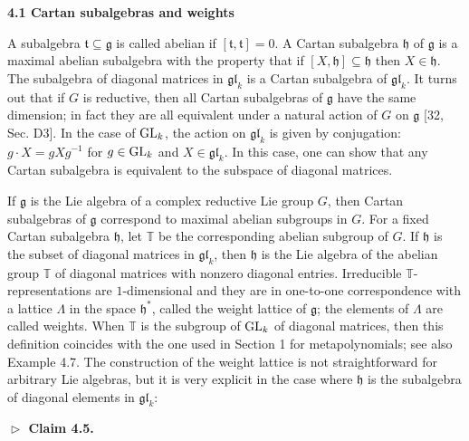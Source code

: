 \par\medskip\noindent\textbf{4.1 Cartan subalgebras and weights}\par




A subalgebra $\mathfrak{t}\subseteq\mathfrak{g}$ is called abelian if $[\mathfrak{t},\mathfrak{t}]=0$. A Cartan subalgebra $\mathfrak{h}$ of $\mathfrak{g}$ is a maximal abelian subalgebra with the property that if $[X,\mathfrak{h}]\subseteq\mathfrak{h}$ then $X\in\mathfrak{h}$. The subalgebra of diagonal matrices in $\mathfrak{gl}_{k}$ is a Cartan subalgebra of $\mathfrak{gl}_{k}$. It turns out that if $G$ is reductive, then all Cartan subalgebras of $\mathfrak{g}$ have the same dimension; in fact they are all equivalent under a natural action of $G$ on $\mathfrak{g}$ [32, Sec. D3]. In the case of $\textnormal{GL}_{k}$, the action on $\mathfrak{gl}_{k}$ is given by conjugation: $g\cdot X=gXg^{-1}$ for $g\in\textnormal{GL}_{k}$ and $X\in\mathfrak{gl}_{k}$. In this case, one can show that any Cartan subalgebra is equivalent to the subspace of diagonal matrices.





If $\mathfrak{g}$ is the Lie algebra of a complex reductive Lie group $G$, then Cartan subalgebras of $\mathfrak{g}$ correspond to maximal abelian subgroups in $G$. For a fixed Cartan subalgebra $\mathfrak{h}$, let $\mathbb{T}$ be the corresponding abelian subgroup of $G$. If $\mathfrak{h}$ is the subset of diagonal matrices in $\mathfrak{gl}_{k}$, then $\mathfrak{h}$ is the Lie algebra of the abelian group $\mathbb{T}$ of diagonal matrices with nonzero diagonal entries.
Irreducible $\mathbb{T}$-representations are $1$-dimensional and they are in one-to-one correspondence with a lattice $\Lambda$ in the space $\mathfrak{h}^{*}$, called the weight lattice of $\mathfrak{g}$; the elements of $\Lambda$ are called weights. When $\mathbb{T}$ is the subgroup of $\textnormal{GL}_{k}$ of diagonal matrices, then this definition coincides with the one used in Section 1 for metapolynomials; see also Example 4.7. The construction of the weight lattice is not straightforward for arbitrary Lie algebras, but it is very explicit in the case where $\mathfrak{h}$ is the subalgebra of diagonal elements in $\mathfrak{gl}_{k}$:





\par\medskip\noindent\textbf{$\vartriangleright$ Claim 4.5.}\par



